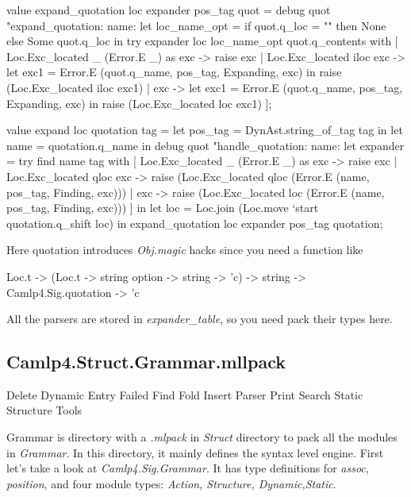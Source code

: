 \begin{ocamlcode}
  value expand_quotation loc expander pos_tag quot =
    debug quot "expand_quotation: name: %
    let loc_name_opt = if quot.q_loc = "" then None else Some quot.q_loc in
    try expander loc loc_name_opt quot.q_contents with
    [ Loc.Exc_located _ (Error.E _) as exc ->
        raise exc
    | Loc.Exc_located iloc exc ->
        let exc1 = Error.E (quot.q_name, pos_tag, Expanding, exc) in
        raise (Loc.Exc_located iloc exc1)
    | exc ->
        let exc1 = Error.E (quot.q_name, pos_tag, Expanding, exc) in
        raise (Loc.Exc_located loc exc1) ];

  value expand loc quotation tag =
    let pos_tag = DynAst.string_of_tag tag in
    let name = quotation.q_name in
    debug quot "handle_quotation: name: %
    let expander =
      try find name tag
      with
      [ Loc.Exc_located _ (Error.E _) as exc -> raise exc
      | Loc.Exc_located qloc exc ->
          raise (Loc.Exc_located qloc (Error.E (name, pos_tag, Finding, exc)))
      | exc ->
          raise (Loc.Exc_located loc (Error.E (name, pos_tag, Finding, exc))) ]
    in
    let loc = Loc.join (Loc.move `start quotation.q_shift loc) in
    expand_quotation loc expander pos_tag quotation;
  \end{ocamlcode}

  Here quotation introduces \textit{Obj.magic} hacks since you need a
  function like

  \begin{ocamlcode}
    Loc.t -> (Loc.t -> string option -> string -> 'c) ->
    string -> Camlp4.Sig.quotation -> 'c
  \end{ocamlcode}

  All the parsers are stored in \textit{expander\_table}, so you need
  pack their types here. 

\subsection{Camlp4.Struct.Grammar.mllpack}
\label{Camlp4.Struct.Grammar}

\begin{bashcode}
Delete
Dynamic
Entry
Failed
Find
Fold
Insert
Parser
Print
Search
Static
Structure
Tools
\end{bashcode}

Grammar is directory with a \textit{.mlpack} in \textit{Struct}
directory to pack all the modules in \textit{Grammar}. In this
directory, it mainly defines the syntax level engine.  First let's
take a look at \textit{Camlp4.Sig.Grammar}.  It has type definitions
for \textit{assoc, position}, and four module types: \textit{Action,
  Structure, Dynamic,Static}.


